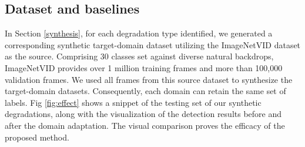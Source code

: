 \begin{table}
\centering
\setlength{\aboverulesep}{0pt}
\setlength{\belowrulesep}{0pt}
\caption{Performance comparison on AP50(\%). The larger, the better. ``PL" refers to the pseudo-label method, and ``Source-only” refers to the models trained by only using labeled source domain data.}
\label{table:overall}
\end{table}

\subsection{Dataset and baselines}
In Section \ref{synthesis}, for each degradation type identified, we generated a corresponding synthetic target-domain dataset utilizing the ImageNetVID dataset \cite{russakovsky2015imagenet} as the source. Comprising 30 classes set against diverse natural backdrops, ImageNetVID provides over 1 million training frames and more than 100,000 validation frames. We used all frames from this source dataset to synthesize the target-domain datasets. Consequently, each domain can retain the same set of labels. Fig \ref{fig:effect} shows a snippet of the testing set of our synthetic degradations, along with the visualization of the detection results before and after the domain adaptation. The visual comparison proves the efficacy of the proposed method.

